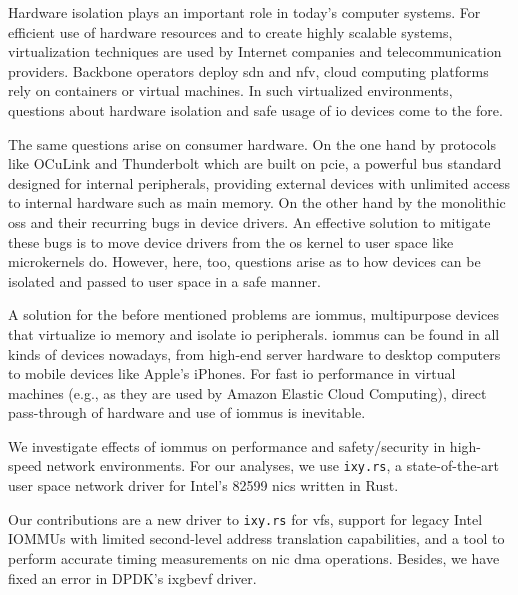 \small

Hardware isolation plays an important role in today's computer systems. For
efficient use of hardware resources and to create highly scalable systems,
virtualization techniques are used by Internet companies and telecommunication
providers. Backbone operators deploy \ac{sdn} and \ac{nfv}, cloud computing
platforms rely on containers or virtual machines. In such virtualized
environments, questions about hardware isolation and safe usage of \acs{io}
devices come to the fore.

The same questions arise on consumer hardware. On the one hand by protocols like
OCuLink and Thunderbolt which are built on \acs{pcie}, a powerful bus standard
designed for internal peripherals, providing external devices with unlimited
access to internal hardware such as main memory. On the other hand by the
monolithic \acp{os} and their recurring bugs in device drivers. An effective
solution to mitigate these bugs is to move device drivers from the \ac{os}
kernel to user space like microkernels do. However, here, too, questions arise
as to how devices can be isolated and passed to user space in a safe manner.

A solution for the before mentioned problems are \acp{iommu}, multipurpose
devices that virtualize \ac{io} memory and isolate \ac{io} peripherals.
\acp{iommu} can be found in all kinds of devices nowadays, from high-end server
hardware to desktop computers to mobile devices like Apple's iPhones. For fast
\ac{io} performance in virtual machines (e.g., as they are used by Amazon
Elastic Cloud Computing), direct pass-through of hardware and use of \acp{iommu}
is inevitable.

We investigate effects of \acp{iommu} on performance and safety/security in
high-speed network environments. For our analyses, we use \texttt{ixy.rs}, a
state-of-the-art user space network driver for Intel's 82599 \acp{nic} written
in Rust.

Our contributions are a new driver to \texttt{ixy.rs} for \acp{vf}, support for
legacy Intel IOMMUs with limited second-level address translation capabilities,
and a tool to perform accurate timing measurements on \ac{nic} \acs{dma}
operations. Besides, we have fixed an error in DPDK's ixgbevf driver.

